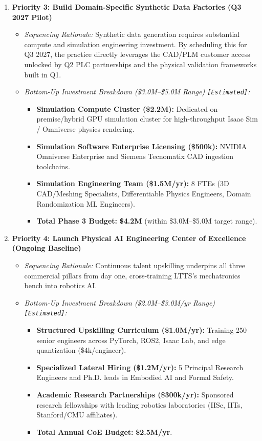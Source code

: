 \documentclass[11pt,a4paper]{article}
\begin{document}
\begin{enumerate}
    \item \textbf{Priority 3: Build Domain-Specific Synthetic Data Factories (Q3 2027 Pilot)}
    \begin{itemize}
        \item \textit{Sequencing Rationale:} Synthetic data generation requires substantial compute and simulation engineering investment. By scheduling this for Q3 2027, the practice directly leverages the CAD/PLM customer access unlocked by Q2 PLC partnerships and the physical validation frameworks built in Q1.
        \item \textit{Bottom-Up Investment Breakdown (\$3.0M--\$5.0M Range) \texttt{[Estimated]}:}
        \begin{itemize}
            \item \textbf{Simulation Compute Cluster (\$2.2M):} Dedicated on-premise/hybrid GPU simulation cluster for high-throughput Isaac Sim / Omniverse physics rendering.
            \item \textbf{Simulation Software Enterprise Licensing (\$500k):} NVIDIA Omniverse Enterprise and Siemens Tecnomatix CAD ingestion toolchains.
            \item \textbf{Simulation Engineering Team (\$1.5M/yr):} 8 FTEs (3D CAD/Meshing Specialists, Differentiable Physics Engineers, Domain Randomization ML Engineers).
            \item \textbf{Total Phase 3 Budget:} \textbf{\$4.2M} (within \$3.0M--\$5.0M target range).
        \end{itemize}
    \end{itemize}

    \item \textbf{Priority 4: Launch Physical AI Engineering Center of Excellence (Ongoing Baseline)}
    \begin{itemize}
        \item \textit{Sequencing Rationale:} Continuous talent upskilling underpins all three commercial pillars from day one, cross-training LTTS's mechatronics bench into robotics AI.
        \item \textit{Bottom-Up Investment Breakdown (\$2.0M--\$3.0M/yr Range) \texttt{[Estimated]}:}
        \begin{itemize}
            \item \textbf{Structured Upskilling Curriculum (\$1.0M/yr):} Training 250 senior engineers across PyTorch, ROS2, Isaac Lab, and edge quantization (\$4k/engineer).
            \item \textbf{Specialized Lateral Hiring (\$1.2M/yr):} 5 Principal Research Engineers and Ph.D. leads in Embodied AI and Formal Safety.
            \item \textbf{Academic Research Partnerships (\$300k/yr):} Sponsored research fellowships with leading robotics laboratories (IISc, IITs, Stanford/CMU affiliates).
            \item \textbf{Total Annual CoE Budget:} \textbf{\$2.5M/yr}.
        \end{itemize}
    \end{itemize}
\end{enumerate}
\end{document}
